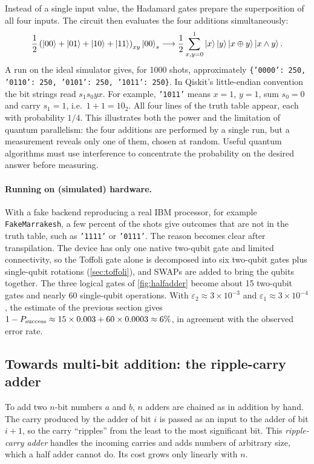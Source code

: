Instead of a single input value, the Hadamard gates prepare the superposition of all four inputs. The circuit then evaluates the four additions simultaneously:
\begin{equation}
  \frac12\left(\left|00\right\rangle+\left|01\right\rangle+\left|10\right\rangle+\left|11\right\rangle\right)_{xy}\left|00\right\rangle_s\longrightarrow\frac12\sum_{x,y=0}^1\left|x\right\rangle\left|y\right\rangle\left|x\oplus y\right\rangle\left|x\wedge y\right\rangle.
\end{equation}
A run on the ideal simulator gives, for 1000 shots, approximately \texttt{\{'0000': 250, '0110': 250, '0101': 250, '1011': 250\}}. In Qiskit's little-endian convention the bit strings read
$s_1s_0yx$. For example, \texttt{'1011'} means $x=1$, $y=1$, sum $s_0=0$ and carry $s_1=1$, i.e.\ $1+1=10_2$. All four lines of the truth table appear, each with probability $1/4$. This illustrates
both the power and the limitation of quantum parallelism: the four additions are performed by a single run, but a measurement reveals only one of them, chosen at random. Useful quantum algorithms
must use interference to concentrate the probability on the desired answer before measuring.

\paragraph{Running on (simulated) hardware.} With a fake backend reproducing a real IBM processor, for example \texttt{FakeMarrakesh}, a few percent of the shots give outcomes that are not in the truth
table, such as \texttt{'1111'} or \texttt{'0111'}. The reason becomes clear after transpilation. The device has only one native two-qubit gate and limited connectivity, so the Toffoli gate alone is
decomposed into six two-qubit gates plus single-qubit rotations (\cref{sec:toffoli}), and SWAPs are added to bring the qubits together. The three logical gates of \cref{fig:halfadder} become about
15 two-qubit gates and nearly 60 single-qubit operations. With $\varepsilon_2\approx3\times10^{-3}$ and $\varepsilon_1\approx3\times10^{-4}$, the estimate of the previous section gives
$1-P_{\rm success}\approx15\times0.003+60\times0.0003\approx6\%$, in agreement with the observed error rate.

\subsection{Towards multi-bit addition: the ripple-carry adder}
To add two $n$-bit numbers $a$ and $b$, $n$ adders are chained as in addition by hand. The carry produced by the adder of bit $i$ is passed as an input to the adder of bit $i+1$, so the carry
``ripples'' from the least to the most significant bit. This \emph{ripple-carry adder} handles the incoming carries and adds numbers of arbitrary size, which a half adder cannot do. Its cost grows
only linearly with $n$.

